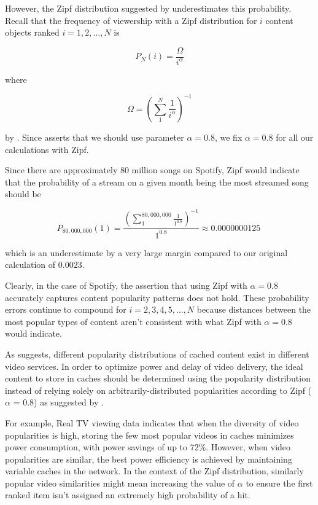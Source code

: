 \documentclass[
	a4paper, %
	10pt, %
	unnumberedsections, %
	twoside, %
]{LTJournalArticle}
\begin{document}
However, the Zipf distribution suggested by \cite{biancoCDNs2017} underestimates this probability. Recall that the frequency of viewership with a Zipf distribution for $i$ content objects ranked $i = 1, 2, \ldots, N$ is

\[
	P_N(i) = \frac{\Omega}{i^{\alpha}}
\] 

where 

\[
	\Omega = \left(\sum_{1}^{N} \frac{1}{i^{\alpha}}\right)^{-1}
\] 

by \cite{749260}. Since \cite{biancoCDNs2017} asserts that we should use parameter $\alpha = 0.8$, we fix $\alpha = 0.8$ for all our calculations with Zipf. 

Since there are approximately $80$ million songs on Spotify, Zipf would indicate that the probability of a stream on a given month being the most streamed song should be 

\[
	P_{80,000,000}(1) = \frac{\left(\sum_{1}^{80,000,000} \frac{1}{1^{0.8}}
	\right)^{-1}}{1^{0.8}} \approx 0.0000000125 \
\] 

which is an underestimate by a very large margin compared to our original calculation of $0.0023$.

Clearly, in the case of Spotify, the assertion that using Zipf with $\alpha = 0.8$ accurately captures content popularity patterns does not hold. These probability errors continue to compound for $i = 2, 3, 4, 5, \ldots, N$ because distances between the most popular types of content aren't consistent with what Zipf with $\alpha = 0.8$ would indicate. 

As \cite{osmanthesis} suggests, different popularity distributions of cached content exist in different video services. In order to optimize power and delay of video delivery, the ideal content to store in caches should be determined using the popularity distribution instead of relying solely on arbitrarily-distributed popularities according to Zipf ($\alpha$ = 0.8) as suggested by \cite{biancoCDNs2017}. 

For example, Real TV viewing data indicates that when the diversity of video popularities is high, storing the few most popular videos in caches minimizes power consumption, with power savings of up to 72\%. However, when video popularities are similar, the best power efficiency is achieved by maintaining variable caches in the network. In the context of the Zipf distribution, similarly popular video similarities might mean increasing the value of $\alpha$ to ensure the first ranked item isn't assigned an extremely high probability of a hit.
\end{document}
